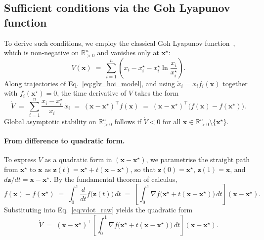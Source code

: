 \documentclass[pdflatex,sn-mathphys-num]{sn-jnl}%
\begin{document}
\subsection{Sufficient conditions via the Goh Lyapunov function}

To derive such conditions, we employ the classical Goh Lyapunov function~\cite{goh_global_1977, hofbauer_evolutionary_1998, allesina_global_2026}, which is non-negative on $\mathbb{R}^n_{>0}$ and vanishes only at $\mathbf{x}^\star$:
\begin{equation}\label{eq:goh}
V(\mathbf{x}) \;=\; \sum_{i=1}^{n} \left( x_i - x_i^\star - x_i^\star \ln \frac{x_i}{x_i^\star} \right).
\end{equation}
Along trajectories of Eq.~\eqref{eq:glv_hoi_model}, and using $\dot{x}_i = x_i f_i(\mathbf{x})$ together with $f_i(\mathbf{x}^\star) = 0$, the time derivative of $V$ takes the form
\begin{equation}\label{eq:vdot_raw}
\dot{V} \;=\; \sum_{i=1}^{n} \frac{x_i - x_i^\star}{x_i}\, \dot{x}_i
 \;=\; (\mathbf{x} - \mathbf{x}^\star)^\top f(\mathbf{x})
 \;=\; (\mathbf{x} - \mathbf{x}^\star)^\top \bigl( f(\mathbf{x}) - f(\mathbf{x}^\star) \bigr).
\end{equation}
Global asymptotic stability on $\mathbb{R}^n_{>0}$ follows if $\dot{V} < 0$ for all $\mathbf{x} \in \mathbb{R}^n_{>0} \setminus \{\mathbf{x}^\star\}$.

\paragraph{From difference to quadratic form.} To express $\dot{V}$ as a quadratic form in $(\mathbf{x} - \mathbf{x}^\star)$, we parametrise the straight path from $\mathbf{x}^\star$ to $\mathbf{x}$ as $\mathbf{z}(t) = \mathbf{x}^\star + t(\mathbf{x} - \mathbf{x}^\star)$, so that $\mathbf{z}(0) = \mathbf{x}^\star$, $\mathbf{z}(1) = \mathbf{x}$, and $d\mathbf{z}/dt = \mathbf{x} - \mathbf{x}^\star$. By the fundamental theorem of calculus,
\begin{equation}\label{eq:ftc}
f(\mathbf{x}) - f(\mathbf{x}^\star) \;=\; \int_0^1 \frac{d}{dt} f\bigl(\mathbf{z}(t)\bigr)\, dt \;=\; \left[\int_0^1 \nabla f\bigl(\mathbf{x}^\star + t(\mathbf{x} - \mathbf{x}^\star)\bigr)\, dt \right] (\mathbf{x} - \mathbf{x}^\star).
\end{equation}
Substituting into Eq.~\eqref{eq:vdot_raw} yields the quadratic form
\begin{equation}\label{eq:vdot_quad}
\dot{V} \;=\; (\mathbf{x} - \mathbf{x}^\star)^\top \left[ \int_0^1 \nabla f\bigl(\mathbf{x}^\star + t(\mathbf{x} - \mathbf{x}^\star)\bigr)\, dt \right] (\mathbf{x} - \mathbf{x}^\star).
\end{equation}
\end{document}
